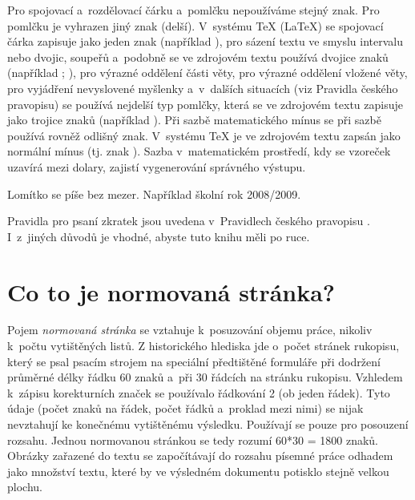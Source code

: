 \begin{itemize}
Pro spojovací a~rozdělovací čárku a~pomlčku nepoužíváme stejný znak. Pro pomlčku je vyhrazen jiný znak (delší). V~systému TeX (LaTeX) se spojovací čárka zapisuje jako jeden znak  (například ), pro sázení textu ve smyslu intervalu nebo dvojic, soupeřů a~podobně se ve zdrojovém textu používá dvojice znaků  (například ; ), pro výrazné oddělení části věty, pro výrazné oddělení vložené věty, pro vyjádření nevyslovené myšlenky a~v~dalších situacích (viz Pravidla českého pravopisu) se používá nejdelší typ pomlčky, která se ve zdrojovém textu zapisuje jako trojice znaků  (například ). Při sazbě matematického mínus se při sazbě používá rovněž odlišný znak. V~systému TeX je ve zdrojovém textu zapsán jako normální mínus (tj. znak ). Sazba v~matematickém prostředí, kdy se vzoreček uzavírá mezi dolary, zajistí vygenerování správného výstupu.

Lomítko se píše bez mezer. Například školní rok 2008/2009.

Pravidla pro psaní zkratek jsou uvedena v~Pravidlech českého pravopisu \cite{Pravidla}. I~z~jiných důvodů je vhodné, abyste tuto knihu měli po ruce. 


\section{Co to je normovaná stránka?}
Pojem {\it normovaná stránka} se vztahuje k~posuzování objemu práce, nikoliv k~počtu vytištěných listů. Z historického hlediska jde o~počet stránek rukopisu, který se psal psacím strojem na speciální předtištěné formuláře při dodržení průměrné délky řádku 60 znaků a~při 30 řádcích na stránku rukopisu. Vzhledem k~zápisu korekturních značek se používalo řádkování 2 (ob jeden řádek). Tyto údaje (počet znaků na řádek, počet řádků a~proklad mezi nimi) se nijak nevztahují ke konečnému vytištěnému výsledku. Používají se pouze pro posouzení rozsahu. Jednou normovanou stránkou se tedy rozumí 60*30 = 1800 znaků. Obrázky zařazené do textu se započítávají do rozsahu písemné práce odhadem jako množství textu, které by ve výsledném dokumentu potisklo stejně velkou plochu.


\end{itemize}
